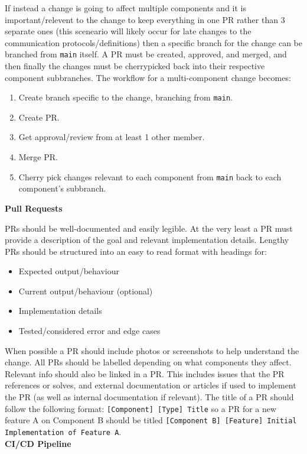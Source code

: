\documentclass{article}
\begin{document}
If instead a change is going to affect multiple components and it is important/relevent to the change to keep everything in one PR rather than 3 separate ones (this sceneario will likely occur for late changes to the communication protocols/definitions) then a specific branch for the change can be branched from \texttt{main} itself. A PR must be created, approved, and merged, and then finally the changes must be cherrypicked back into their respective component subbranches. The workflow for a multi-component change becomes:

\begin{enumerate}
\item Create branch specific to the change, branching from \texttt{main}.
\item Create PR.
\item Get approval/review from at least 1 other member.
\item Merge PR.
\item Cherry pick changes relevant to each component from \texttt{main} back to each component's subbranch.
\end{enumerate}

\textbf{Pull Requests}

PRs should be well-documented and easily legible. At the very least a PR must provide a description of the goal and relevant implementation details. Lengthy PRs should be structured into an easy to read format with headings for:
\begin{itemize}
\item Expected output/behaviour
\item Current output/behaviour (optional)
\item Implementation details
\item Tested/considered error and edge cases
\end{itemize}
When possible a PR should include photos or screenshots to help understand the change. All PRs should be labelled depending on what components they affect. Relevant info should also be linked in a PR. This includes issues that the PR references or solves, and external documentation or articles if used to implement the PR (as well as internal documentation if relevant). The title of a PR should follow the following format: \texttt{[Component] [Type] Title} so a PR for a new feature A on Component B should be titled \texttt{[Component B] [Feature] Initial Implementation of Feature A}.\\

\textbf{CI/CD Pipeline}
\end{document}
